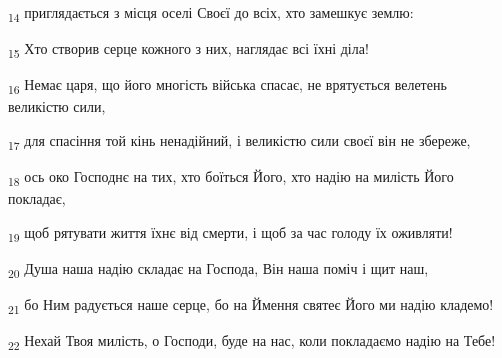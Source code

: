 \begin{tcolorbox}
\textsubscript{14} приглядається з місця оселі Своєї до всіх, хто замешкує землю:
\end{tcolorbox}
\begin{tcolorbox}
\textsubscript{15} Хто створив серце кожного з них, наглядає всі їхні діла!
\end{tcolorbox}
\begin{tcolorbox}
\textsubscript{16} Немає царя, що його многість війська спасає, не врятується велетень великістю сили,
\end{tcolorbox}
\begin{tcolorbox}
\textsubscript{17} для спасіння той кінь ненадійний, і великістю сили своєї він не збереже,
\end{tcolorbox}
\begin{tcolorbox}
\textsubscript{18} ось око Господнє на тих, хто боїться Його, хто надію на милість Його покладає,
\end{tcolorbox}
\begin{tcolorbox}
\textsubscript{19} щоб рятувати життя їхнє від смерти, і щоб за час голоду їх оживляти!
\end{tcolorbox}
\begin{tcolorbox}
\textsubscript{20} Душа наша надію складає на Господа, Він наша поміч і щит наш,
\end{tcolorbox}
\begin{tcolorbox}
\textsubscript{21} бо Ним радується наше серце, бо на Ймення святеє Його ми надію кладемо!
\end{tcolorbox}
\begin{tcolorbox}
\textsubscript{22} Нехай Твоя милість, о Господи, буде на нас, коли покладаємо надію на Тебе!
\end{tcolorbox}
